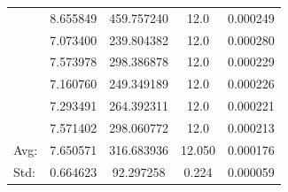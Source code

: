 \documentclass[11pt,onside]{article}
\begin{document}
\begin{description}
\begin {table}[ht]
\begin{tabular}{lcccc}
  &  8.655849 &  459.757240 &            12.0 &    0.000249 \\
  &  7.073400 &  239.804382 &            12.0 &    0.000280 \\
  &  7.573978 &  298.386878 &            12.0 &    0.000229 \\
  &  7.160760 &  249.349189 &            12.0 &    0.000226 \\
  &  7.293491 &  264.392311 &            12.0 &    0.000221 \\
  &  7.571402 &  298.060772 &            12.0 &    0.000213 \\
\bottomrule
Avg: & 7.650571 & 316.683936 & 12.050 & 0.000176 \\
Std:  & 0.664623 & 92.297258 & 0.224 & 0.000059\\
\bottomrule
\end{tabular}
\end {table}


\end{description}
\end{document}
